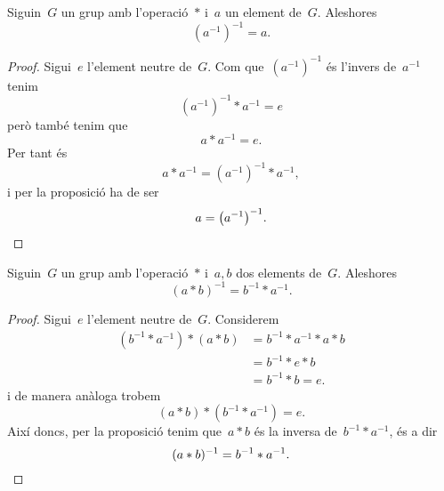 \documentclass[../../main.tex]{subfiles}
\begin{document}
    \begin{proposition}
        \label{prop:grups:l'invers de l'invers d'un element es l'element}
        Siguin~\(G\) un grup amb l'operació~\(\ast\) i~\(a\) un element de~\(G\).
        Aleshores
        \[
            \left(a^{-1}\right)^{-1}=a.
        \]
        \begin{proof}
            Sigui~\(e\) l'element neutre de~\(G\).
            Com que~\(\left(a^{-1}\right)^{-1}\) és l'invers de~\(a^{-1}\) tenim
            \[
                \left(a^{-1}\right)^{-1}\ast a^{-1}=e
            \]
            però també tenim que
            \[
                a\ast a^{-1}=e.
            \]
            Per tant és
            \[
                a\ast a^{-1}=(a^{-1})^{-1}\ast a^{-1},
            \]
            i per la proposició  ha de ser
            \[
                a=\left(a^{-1}\right)^{-1}.\qedhere
            \]
        \end{proof}
    \end{proposition}
    \begin{proposition}
        \label{prop:invers de a b = b invers a invers}
        Siguin~\(G\) un grup amb l'operació~\(\ast\) i~\(a,b\) dos elements de~\(G\).
        Aleshores
        \[
            (a\ast b)^{-1}=b^{-1}\ast a^{-1}.
        \]
        \begin{proof}
            Sigui~\(e\) l'element neutre de~\(G\).
            Considerem
            \begin{align*}
            (b^{-1}\ast a^{-1})\ast(a\ast b)&=b^{-1}\ast a^{-1}\ast a\ast b\\
            &=b^{-1}\ast e\ast b\\
            &=b^{-1}\ast b=e.
            \end{align*}
            i de manera anàloga trobem
            \[
                (a\ast b)\ast(b^{-1}\ast a^{-1})=e.
            \]
            Així doncs, per la proposició  tenim que~\(a\ast b\) és la inversa de~\(b^{-1}\ast a^{-1}\), és a dir
            \[
                (a\ast b)^{-1}=b^{-1}\ast a^{-1}.\qedhere
            \]
        \end{proof}
    \end{proposition}
\end{document}
